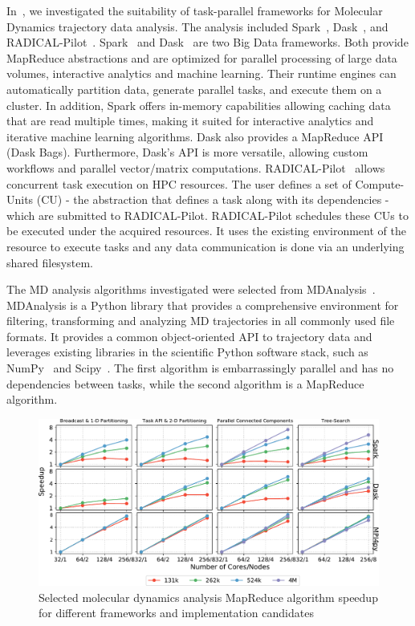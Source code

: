 In~\cite{paraskevakos2018task}, we investigated the suitability of task-parallel 
frameworks for Molecular Dynamics trajectory data analysis. The analysis 
included Spark~\cite{zaharia2010spark}, Dask~\cite{rocklin2015dask}, and 
RADICAL-Pilot~\cite{merzky2019using}. Spark~\cite{zaharia2010spark} and 
Dask~\cite{rocklin2015dask} are two Big Data frameworks. Both provide MapReduce 
abstractions and are optimized for parallel processing of large data volumes, 
interactive analytics and machine learning. Their runtime engines can 
automatically partition data, generate parallel tasks, and execute them on a 
cluster. In addition, Spark offers in-memory capabilities allowing caching data 
that are read multiple times, making it suited for interactive analytics and 
iterative machine learning algorithms. Dask also provides a MapReduce API 
(Dask Bags). Furthermore, Dask’s API is more versatile, allowing custom 
workflows and parallel vector/matrix computations. 
RADICAL-Pilot~\cite{merzky2019using} allows concurrent task execution on HPC 
resources. The user defines a set of Compute-Units (CU) - the abstraction that 
defines a task along with its dependencies - which are submitted to 
RADICAL-Pilot. RADICAL-Pilot schedules these CUs to be executed under the 
acquired resources. It uses the existing environment of the resource to execute 
tasks and any data communication is done via an underlying shared filesystem.

The MD analysis algorithms investigated were selected from 
MDAnalysis~\cite{gowers2016mdanalysis,michaud2011mdanalysis}. MDAnalysis is a 
Python library that provides a comprehensive environment for filtering, 
transforming and analyzing MD trajectories in all commonly used file formats. It 
provides a common object-oriented API to trajectory data and leverages existing 
libraries in the scientific Python software stack, such as NumPy~\cite{numpy} 
and Scipy~\cite{scipy}. The first algorithm is embarrassingly parallel and has 
no dependencies between tasks, while the second algorithm is a MapReduce 
algorithm.

\begin{figure}[t]
    \centering
    \includegraphics[width=.95\textwidth]{figures/All4approachesWith4MSpeedup.pdf}
    \caption{Selected molecular dynamics analysis MapReduce algorithm speedup 
    for different frameworks and implementation candidates}\label{fig:leafletfinder}
\end{figure}

